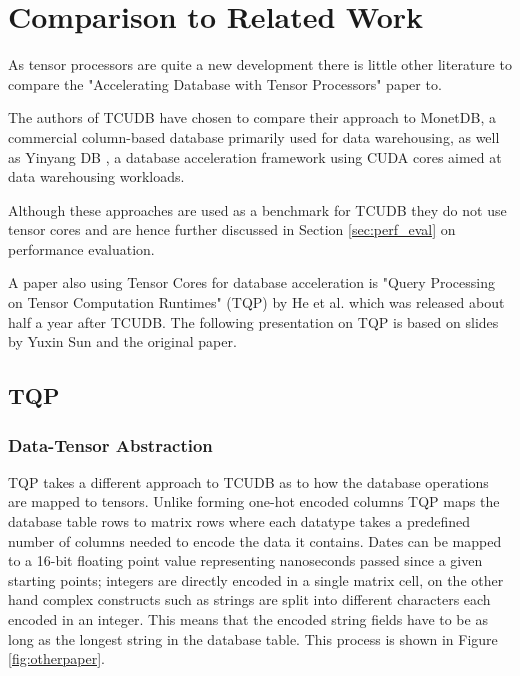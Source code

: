\documentclass{paper}
\begin{document}
	\section{Comparison to Related Work} \label{sec:rel_work}
	As tensor processors are quite a new development there is little other literature to compare the "Accelerating Database with Tensor Processors" paper to. 
	
	The authors of TCUDB have chosen to compare their approach to MonetDB, a commercial column-based database primarily used for data warehousing, as well as  Yinyang DB \cite{yuan2013yin}, a database acceleration framework using CUDA cores aimed at data warehousing workloads. 
	
	Although these approaches are used as a benchmark for TCUDB they do not use tensor cores and are hence further discussed in Section \ref{sec:perf_eval} on performance evaluation.
	
	A paper also using Tensor Cores for database acceleration is "Query Processing on Tensor Computation Runtimes" (TQP) \cite{he2022query} by He et al. which was released about half a year after TCUDB. The following presentation on TQP is based on slides by Yuxin Sun \cite{sun_2022} and the original paper.
	
	\subsection{TQP}
	
	\subsubsection{Data-Tensor Abstraction}
	
	TQP takes a different approach to TCUDB as to how the database operations are mapped to tensors. Unlike forming one-hot encoded columns TQP maps the database table rows to matrix rows where each datatype takes a predefined number of columns needed to encode the data it contains. Dates can be mapped to a 16-bit floating point value representing nanoseconds passed since a given starting points; integers are directly encoded in a single matrix cell, on the other hand complex constructs such as strings are split into different characters each encoded in an integer. This means that the encoded string fields have to be as long as the longest string in the database table. This process is shown in Figure \ref{fig:otherpaper}.
	
\end{document}
